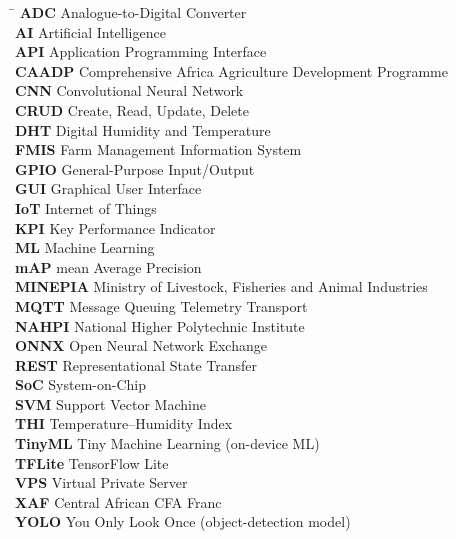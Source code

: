 \documentclass[12pt,a4paper]{report}
\begin{document}
\begin{tabbing}
\hspace{2.5cm}\=\kill
\textbf{ADC} \> Analogue-to-Digital Converter \\[0.3em]
\textbf{AI} \> Artificial Intelligence \\[0.3em]
\textbf{API} \> Application Programming Interface \\[0.3em]
\textbf{CAADP} \> Comprehensive Africa Agriculture Development Programme \\[0.3em]
\textbf{CNN} \> Convolutional Neural Network \\[0.3em]
\textbf{CRUD} \> Create, Read, Update, Delete \\[0.3em]
\textbf{DHT} \> Digital Humidity and Temperature \\[0.3em]
\textbf{FMIS} \> Farm Management Information System \\[0.3em]
\textbf{GPIO} \> General-Purpose Input/Output \\[0.3em]
\textbf{GUI} \> Graphical User Interface \\[0.3em]
\textbf{IoT} \> Internet of Things \\[0.3em]
\textbf{KPI} \> Key Performance Indicator \\[0.3em]
\textbf{ML} \> Machine Learning \\[0.3em]
\textbf{mAP} \> mean Average Precision \\[0.3em]
\textbf{MINEPIA} \> Ministry of Livestock, Fisheries and Animal Industries \\[0.3em]
\textbf{MQTT} \> Message Queuing Telemetry Transport \\[0.3em]
\textbf{NAHPI} \> National Higher Polytechnic Institute \\[0.3em]
\textbf{ONNX} \> Open Neural Network Exchange \\[0.3em]
\textbf{REST} \> Representational State Transfer \\[0.3em]
\textbf{SoC} \> System-on-Chip \\[0.3em]
\textbf{SVM} \> Support Vector Machine \\[0.3em]
\textbf{THI} \> Temperature--Humidity Index \\[0.3em]
\textbf{TinyML} \> Tiny Machine Learning (on-device ML) \\[0.3em]
\textbf{TFLite} \> TensorFlow Lite \\[0.3em]
\textbf{VPS} \> Virtual Private Server \\[0.3em]
\textbf{XAF} \> Central African CFA Franc \\[0.3em]
\textbf{YOLO} \> You Only Look Once (object-detection model) \\[0.3em]
\end{tabbing}
\end{document}
